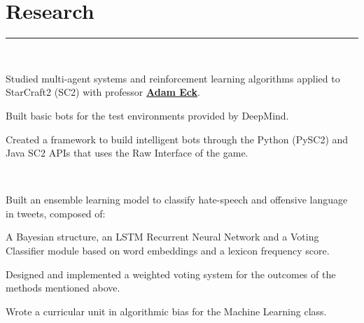 \documentclass[]{dafirebanks-resume-openfont}
\begin{document}
\begin{minipage}[t]{0.66\textwidth}

\section{Research}
\vspace{-3pt}
{\color{blue}\hrule} \vspace{5pt}
 \\
\hspace{70pt} 
\begin{tightemize}
	\item Studied multi-agent systems and reinforcement learning algorithms applied to StarCraft2 (SC2) with professor \textbf{\href{http://www.cs.oberlin.edu/~aeck/}{Adam Eck}}.  
	\item Built basic bots for the test environments provided by DeepMind.
	\item Created a framework to build intelligent bots through the Python (PySC2) and Java SC2 APIs that uses the Raw Interface of the game. 
\end{tightemize}
\sectionsep

\\
\hspace{81pt} 
\begin{tightemize}
	\item Built an ensemble learning model to classify hate-speech and offensive language in tweets, composed of:
	\vspace{\topsep}
	\begin{tightemize}
		\item A Bayesian structure, an LSTM Recurrent Neural Network and a Voting Classifier module based on word embeddings and a lexicon frequency score. 
	\end{tightemize}\vspace{\topsep}
	\item Designed and implemented a weighted voting system for the outcomes of the methods mentioned above.
	\item Wrote a curricular unit in algorithmic bias for the Machine Learning class.
\end{tightemize}
\sectionsep



\end{minipage}
\end{document}
